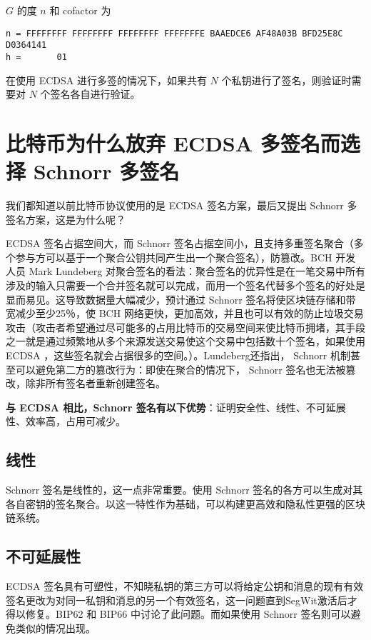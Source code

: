 \documentclass[a4paper,10pt]{article}
\begin{document}
\(G\) 的度 \(n\) 和 cofactor 为
\begin{lstlisting}
n = FFFFFFFF FFFFFFFF FFFFFFFF FFFFFFFE BAAEDCE6 AF48A03B BFD25E8C D0364141 
h =       01
\end{lstlisting}

在使用 ECDSA 进行多签的情况下，如果共有 \(N\) 个私钥进行了签名，则验证时需要对 \(N\) 个签名各自进行验证。

\section{比特币为什么放弃 ECDSA 多签名而选择 Schnorr 多签名}
我们都知道以前比特币协议使用的是 ECDSA 签名方案，最后又提出 Schnorr 多签名方案，这是为什么呢？

 ECDSA 签名占据空间大，而 Schnorr 签名占据空间小，且支持多重签名聚合（多个参与方可以基于一个聚合公钥共同产生出一个聚合签名），防篡改。BCH 开发人员 Mark Lundeberg 对聚合签名的看法：聚合签名的优异性是在一笔交易中所有涉及的输入只需要一个合并签名就可以完成，而用一个签名代替多个签名的好处是显而易见。这导致数据量大幅减少，预计通过 Schnorr 签名将使区块链存储和带宽减少至少25％，使 BCH 网络更快，更加高效，并且也可以有效的防止垃圾交易攻击（攻击者希望通过尽可能多的占用比特币的交易空间来使比特币拥堵，其手段之一就是通过频繁地从多个来源发送交易使这个交易中包括数十个签名，如果使用 ECDSA ，这些签名就会占据很多的空间。）。Lundeberg还指出， Schnorr 机制甚至可以避免第二方的篡改行为：即使在聚合的情况下， Schnorr 签名也无法被篡改，除非所有签名者重新创建签名。

\textbf{与 ECDSA 相比，Schnorr 签名有以下优势}：证明安全性、线性、不可延展性、效率高，占用可减少。

\subsection{线性}

 Schnorr 签名是线性的，这一点非常重要。使用 Schnorr 签名的各方可以生成对其各自密钥的签名聚合。以这一特性作为基础，可以构建更高效和隐私性更强的区块链系统。

\subsection{不可延展性}

 ECDSA 签名具有可塑性，不知晓私钥的第三方可以将给定公钥和消息的现有有效签名更改为对同一私钥和消息的另一个有效签名，这一问题直到SegWit激活后才得以修复。BIP62 \cite{bip62} 和 BIP66 \cite{bip66}中讨论了此问题。而如果使用 Schnorr 签名则可以避免类似的情况出现。
\end{document}
